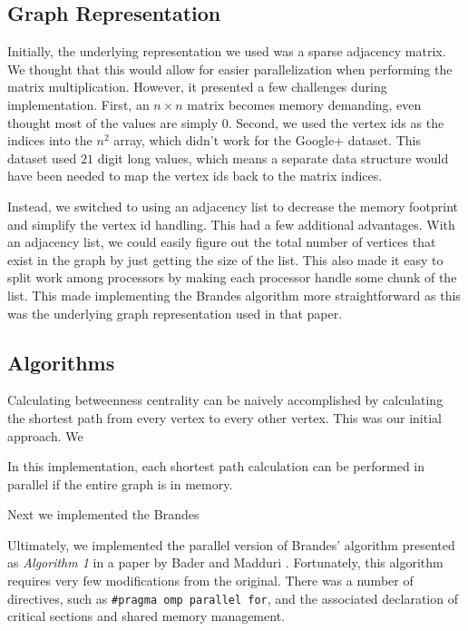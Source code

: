 \documentclass[11pt,a4paper,titlepage]{article}
\begin{document}
\subsection{Graph Representation}

Initially, the underlying representation we used was a sparse adjacency matrix.
We thought that this would allow for easier parallelization when performing the
matrix multiplication. However, it presented a few challenges during
implementation. First, an $n \times n$ matrix becomes memory demanding, even
thought most of the values are simply $0$. Second, we used the vertex ids as
the indices into the $n^2$ array, which didn't work for the Google+ dataset.
This dataset used $21$ digit long values, which means a separate data structure
would have been needed to map the vertex ids back to the matrix indices.

Instead, we switched to using an adjacency list to decrease the memory
footprint and simplify the vertex id handling. This had a few additional
advantages. With an adjacency list, we could easily figure out the total number
of vertices that exist in the graph by just getting the size of the list. This
also made it easy to split work among processors by making each processor
handle some chunk of the list. This made implementing the Brandes algorithm
more straightforward as this was the underlying graph representation used in
that paper.


\subsection{Algorithms}

Calculating betweenness centrality can be naively accomplished by calculating
the shortest path from every vertex to every other vertex. This was our initial
approach. We 

In this
implementation, each shortest path calculation can be performed in parallel if
the entire graph is in memory.

Next we implemented the Brandes

Ultimately, we implemented the parallel version of Brandes' algorithm presented
as \textit{Algorithm 1} in a paper by Bader and Madduri
\cite{bader2006parallel}. Fortunately, this algorithm requires very few
modifications from the original. There was a number of directives, such as
\texttt{\#pragma omp parallel for}, and the associated declaration of critical
sections and shared memory management.
\end{document}

